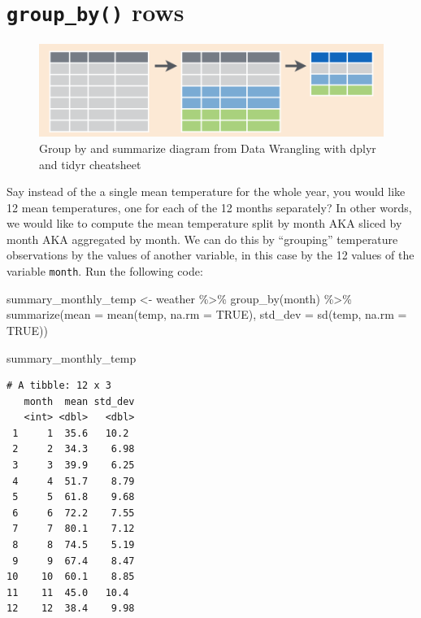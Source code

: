 \documentclass[
  letterpaper,
  DIV=11,
  numbers=noendperiod]{scrreprt}
\newenvironment{Shaded}{\begin{snugshade}}{\end{snugshade}}
\newcommand{\AttributeTok}[1]{\textcolor[rgb]{0.40,0.45,0.13}{#1}}
\newcommand{\ConstantTok}[1]{\textcolor[rgb]{0.56,0.35,0.01}{#1}}
\newcommand{\FunctionTok}[1]{\textcolor[rgb]{0.28,0.35,0.67}{#1}}
\newcommand{\NormalTok}[1]{\textcolor[rgb]{0.00,0.23,0.31}{#1}}
\newcommand{\OtherTok}[1]{\textcolor[rgb]{0.00,0.23,0.31}{#1}}
\newcommand{\SpecialCharTok}[1]{\textcolor[rgb]{0.37,0.37,0.37}{#1}}
\theoremstyle{definition}
\theoremstyle{remark}
\begin{document}
\hypertarget{sec-groupby}{%
\section{\texorpdfstring{\texttt{group\_by()}
rows}{group\_by() rows}}\label{sec-groupby}}

\begin{figure}

{\centering \includegraphics{images/group_summary.png}

}

\caption{Group by and summarize diagram from Data Wrangling with dplyr
and tidyr cheatsheet}

\end{figure}

Say instead of the a single mean temperature for the whole year, you
would like 12 mean temperatures, one for each of the 12 months
separately? In other words, we would like to compute the mean
temperature split by month AKA sliced by month AKA aggregated by month.
We can do this by ``grouping'' temperature observations by the values of
another variable, in this case by the 12 values of the variable
\texttt{month}. Run the following code:

\begin{Shaded}
\begin{Highlighting}[]
\NormalTok{summary\_monthly\_temp }\OtherTok{\textless{}{-}}\NormalTok{ weather }\SpecialCharTok{\%\textgreater{}\%} 
  \FunctionTok{group\_by}\NormalTok{(month) }\SpecialCharTok{\%\textgreater{}\%} 
  \FunctionTok{summarize}\NormalTok{(}\AttributeTok{mean =} \FunctionTok{mean}\NormalTok{(temp, }\AttributeTok{na.rm =} \ConstantTok{TRUE}\NormalTok{), }
            \AttributeTok{std\_dev =} \FunctionTok{sd}\NormalTok{(temp, }\AttributeTok{na.rm =} \ConstantTok{TRUE}\NormalTok{))}

\NormalTok{summary\_monthly\_temp}
\end{Highlighting}
\end{Shaded}

\begin{verbatim}
# A tibble: 12 x 3
   month  mean std_dev
   <int> <dbl>   <dbl>
 1     1  35.6   10.2 
 2     2  34.3    6.98
 3     3  39.9    6.25
 4     4  51.7    8.79
 5     5  61.8    9.68
 6     6  72.2    7.55
 7     7  80.1    7.12
 8     8  74.5    5.19
 9     9  67.4    8.47
10    10  60.1    8.85
11    11  45.0   10.4 
12    12  38.4    9.98
\end{verbatim}
\end{document}
